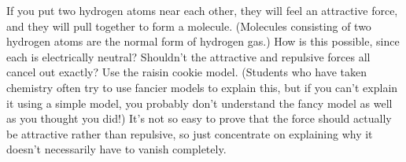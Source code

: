 If you put two hydrogen atoms near each other, they will
feel an attractive force, and they will pull together to
form a molecule. (Molecules consisting of two hydrogen
atoms are the normal form of hydrogen gas.) How is this
possible, since each is
electrically neutral? Shouldn't the attractive and
repulsive forces all cancel out exactly? Use the raisin
cookie model. (Students who have taken chemistry often try
to use fancier models to explain this, but if you can't
explain it using a simple model, you probably don't
understand the fancy model as well as you thought you did!)
It's not so easy to prove that the force should actually be
attractive rather than repulsive, so just concentrate on
explaining why it doesn't necessarily have to vanish
completely.
